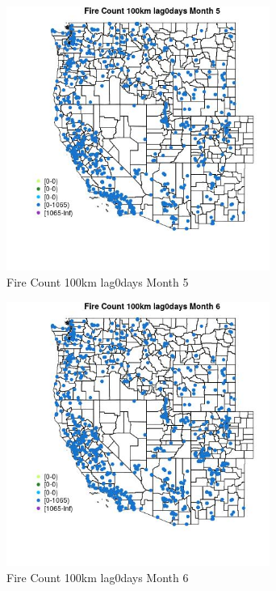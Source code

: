 \begin{figure} 
\centering  
\includegraphics[width=0.77\textwidth]{Code_Outputs/Report_ML_input_PM25_Step4_part_f_de_duplicated_aves_prioritize_24hr_obswNAs_MapObsMo5Fire_Count_100km_lag0days.jpg} 
\caption{\label{fig:Report_ML_input_PM25_Step4_part_f_de_duplicated_aves_prioritize_24hr_obswNAsMapObsMo5Fire_Count_100km_lag0days}Fire Count 100km lag0days Month 5} 
\end{figure} 
 

\begin{figure} 
\centering  
\includegraphics[width=0.77\textwidth]{Code_Outputs/Report_ML_input_PM25_Step4_part_f_de_duplicated_aves_prioritize_24hr_obswNAs_MapObsMo6Fire_Count_100km_lag0days.jpg} 
\caption{\label{fig:Report_ML_input_PM25_Step4_part_f_de_duplicated_aves_prioritize_24hr_obswNAsMapObsMo6Fire_Count_100km_lag0days}Fire Count 100km lag0days Month 6} 
\end{figure} 
 

